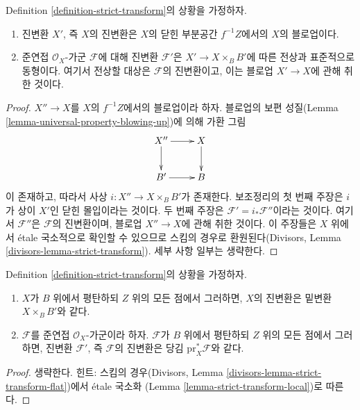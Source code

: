 \begin{lemma}
\label{lemma-strict-transform}
Definition \ref{definition-strict-transform}의 상황을 가정하자.
\begin{enumerate}
\item 진변환 $X'$, 즉 $X$의 진변환은 $X$의 닫힌 부분공간
$f^{-1}Z$에서의 $X$의 블로업이다.
\item 준연접 $\mathcal{O}_X$-가군 $\mathcal{F}$에 대해 진변환
$\mathcal{F}'$은 $X' \to X \times_B B'$에 따른 전상과 표준적으로
동형이다. 여기서 전상할 대상은 $\mathcal{F}$의 진변환이고, 이는 블로업
$X' \to X$에 관해 취한 것이다.
\end{enumerate}
\end{lemma}

\begin{proof}
$X'' \to X$를 $X$의 $f^{-1}Z$에서의 블로업이라 하자. 블로업의 보편
성질(Lemma \ref{lemma-universal-property-blowing-up})에 의해 가환 그림
$$
\xymatrix{
X'' \ar[r] \ar[d] & X \ar[d] \\
B' \ar[r] & B
}
$$
이 존재하고, 따라서 사상 $i : X'' \to X \times_B B'$가 존재한다.
보조정리의 첫 번째 주장은 $i$가 상이 $X'$인 닫힌 몰입이라는 것이다.
두 번째 주장은 $\mathcal{F}' = i_*\mathcal{F}''$이라는 것이다. 여기서
$\mathcal{F}''$은 $\mathcal{F}$의 진변환이며, 블로업 $X'' \to X$에
관해 취한 것이다. 이 주장들은 $X$ 위에서 \'etale 국소적으로 확인할 수 있으므로
스킴의 경우로 환원된다(Divisors, Lemma
\ref{divisors-lemma-strict-transform}). 세부 사항 일부는 생략한다.
\end{proof}

\begin{lemma}
\label{lemma-strict-transform-flat}
Definition \ref{definition-strict-transform}의 상황을 가정하자.
\begin{enumerate}
\item $X$가 $B$ 위에서 평탄하되 $Z$ 위의 모든 점에서 그러하면, $X$의 진변환은
밑변환 $X \times_B B'$와 같다.
\item $\mathcal{F}$를 준연접 $\mathcal{O}_X$-가군이라 하자.
$\mathcal{F}$가 $B$ 위에서 평탄하되 $Z$ 위의 모든 점에서 그러하면,
진변환 $\mathcal{F}'$, 즉 $\mathcal{F}$의 진변환은 당김
$\text{pr}_X^*\mathcal{F}$와 같다.
\end{enumerate}
\end{lemma}

\begin{proof}
생략한다. 힌트: 스킴의 경우(Divisors, Lemma
\ref{divisors-lemma-strict-transform-flat})에서 \'etale 국소화
(Lemma \ref{lemma-strict-transform-local})로 따른다.
\end{proof}

